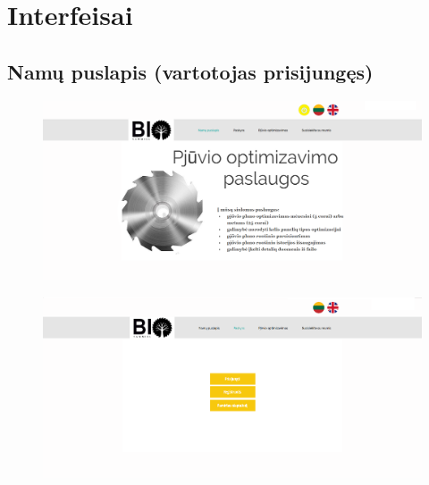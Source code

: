 \documentclass[a4paper,12pt]{article}
\begin{document}
\clearpage

\section{Interfeisai}

\subsection{Namų puslapis (vartotojas prisijungęs)}
\begin{figure}[!tph]
\hspace{-3cm}
\centering
\includegraphics[scale=0.5]{interfeisai/pagrindinis}
\label{fig:verticalcell}
\end{figure}

\begin{figure}[!tph]
\hspace{-3cm}
\centering
\includegraphics[scale=0.5]{interfeisai/paskyrosPuslapisNeprisijungta}
\label{fig:verticalcell}
\end{figure}
\end{document}
